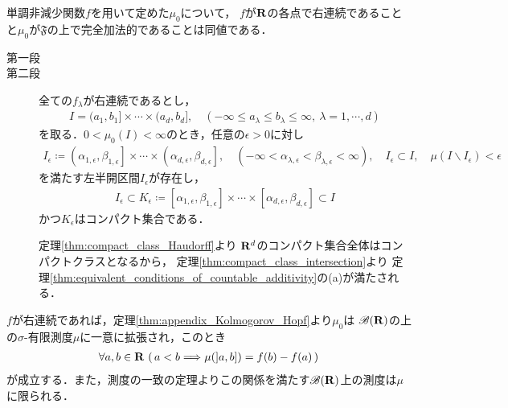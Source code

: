 	\begin{screen}
		\begin{thm}[右連続性と完全加法性]
			単調非減少関数$f$を用いて定めた$\mu_0$について，
			$f$が$\mathbf{R}$の各点で右連続であることと$\mu_0$が$\mathfrak{F}$の上で完全加法的であることは同値である．
		\end{thm}
	\end{screen}
	
	\begin{prf}\mbox{}
		\begin{description}
			\item[第一段]
				
			\item[第二段]
				全ての$f_\lambda$が右連続であるとし，
				\begin{align}
					I = (a_1,b_1] \times \cdots \times (a_d,b_d],
					\quad (-\infty \leq a_\lambda \leq b_\lambda \leq \infty,\ 
					\lambda = 1,\cdots,d)
				\end{align}
				を取る．$0 < \mu_0(I) < \infty$のとき，任意の$\epsilon > 0$に対し
				\begin{align}
					I_\epsilon \coloneqq 
					\left(\alpha_{1,\epsilon},\beta_{1,\epsilon}\right]
					\times \cdots \times
					\left(\alpha_{d,\epsilon},\beta_{d,\epsilon}\right],
					\quad (-\infty < \alpha_{\lambda,\epsilon} < \beta_{\lambda,\epsilon} < \infty),
					\quad I_\epsilon \subset I,
					\quad \mu(I \backslash I_\epsilon) < \epsilon
				\end{align}
				を満たす左半開区間$I_\epsilon$が存在し，
				\begin{align}
					I_\epsilon \subset 
					K_\epsilon \coloneqq \left[\alpha_{1,\epsilon},\beta_{1,\epsilon}\right]
					\times \cdots \times
					\left[\alpha_{d,\epsilon},\beta_{d,\epsilon}\right]
					\subset I
				\end{align}
				かつ$K_\epsilon$はコンパクト集合である．
				
				定理\ref{thm:compact_class_Haudorff}より
				$\mathbf{R}^d$のコンパクト集合全体はコンパクトクラスとなるから，
				定理\ref{thm:compact_class_intersection}より
				定理\ref{thm:equivalent_conditions_of_countable_additivity}の(a)が満たされる．
		\end{description}
	\end{prf}
	
	$f$が右連続であれば，定理\ref{thm:appendix_Kolmogorov_Hopf}より$\mu_0$は
	$\mathscr{B}(\mathbf{R})$の上の$\sigma$-有限測度$\mu$に一意に拡張され，このとき
	\begin{align}
		\forall a,b \in \mathbf{R}\, \left(\, a < b \Longrightarrow \mu(]a,b]) = f(b) - f(a)\, \right)
	\end{align}
	が成立する．また，測度の一致の定理よりこの関係を満たす$\mathscr{B}(\mathbf{R})$上の測度は$\mu$に限られる．
	
